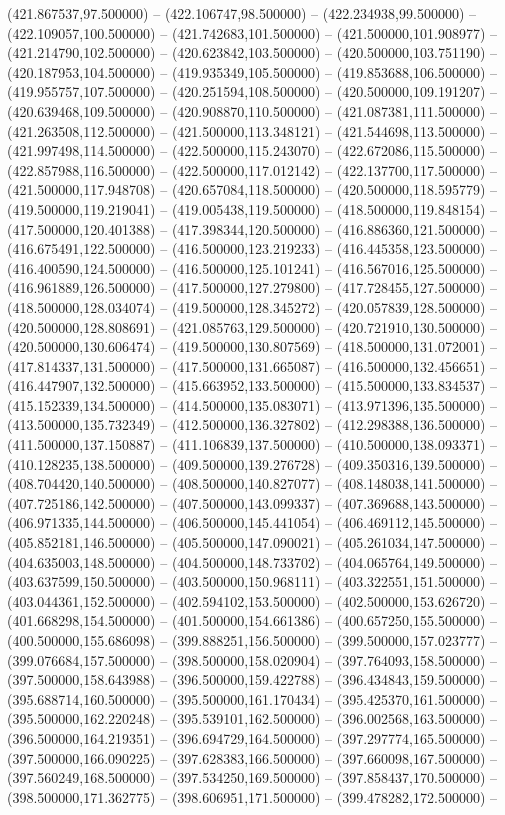 (421.867537,97.500000) -- (422.106747,98.500000) -- (422.234938,99.500000) -- (422.109057,100.500000) -- (421.742683,101.500000) -- (421.500000,101.908977) -- (421.214790,102.500000) -- (420.623842,103.500000) -- (420.500000,103.751190) -- (420.187953,104.500000) -- (419.935349,105.500000) -- (419.853688,106.500000) -- (419.955757,107.500000) -- (420.251594,108.500000) -- (420.500000,109.191207) -- (420.639468,109.500000) -- (420.908870,110.500000) -- (421.087381,111.500000) -- (421.263508,112.500000) -- (421.500000,113.348121) -- (421.544698,113.500000) -- (421.997498,114.500000) -- (422.500000,115.243070) -- (422.672086,115.500000) -- (422.857988,116.500000) -- (422.500000,117.012142) -- (422.137700,117.500000) -- (421.500000,117.948708) -- (420.657084,118.500000) -- (420.500000,118.595779) -- (419.500000,119.219041) -- (419.005438,119.500000) -- (418.500000,119.848154) -- (417.500000,120.401388) -- (417.398344,120.500000) -- (416.886360,121.500000) -- (416.675491,122.500000) -- (416.500000,123.219233) -- (416.445358,123.500000) -- (416.400590,124.500000) -- (416.500000,125.101241) -- (416.567016,125.500000) -- (416.961889,126.500000) -- (417.500000,127.279800) -- (417.728455,127.500000) -- (418.500000,128.034074) -- (419.500000,128.345272) -- (420.057839,128.500000) -- (420.500000,128.808691) -- (421.085763,129.500000) -- (420.721910,130.500000) -- (420.500000,130.606474) -- (419.500000,130.807569) -- (418.500000,131.072001) -- (417.814337,131.500000) -- (417.500000,131.665087) -- (416.500000,132.456651) -- (416.447907,132.500000) -- (415.663952,133.500000) -- (415.500000,133.834537) -- (415.152339,134.500000) -- (414.500000,135.083071) -- (413.971396,135.500000) -- (413.500000,135.732349) -- (412.500000,136.327802) -- (412.298388,136.500000) -- (411.500000,137.150887) -- (411.106839,137.500000) -- (410.500000,138.093371) -- (410.128235,138.500000) -- (409.500000,139.276728) -- (409.350316,139.500000) -- (408.704420,140.500000) -- (408.500000,140.827077) -- (408.148038,141.500000) -- (407.725186,142.500000) -- (407.500000,143.099337) -- (407.369688,143.500000) -- (406.971335,144.500000) -- (406.500000,145.441054) -- (406.469112,145.500000) -- (405.852181,146.500000) -- (405.500000,147.090021) -- (405.261034,147.500000) -- (404.635003,148.500000) -- (404.500000,148.733702) -- (404.065764,149.500000) -- (403.637599,150.500000) -- (403.500000,150.968111) -- (403.322551,151.500000) -- (403.044361,152.500000) -- (402.594102,153.500000) -- (402.500000,153.626720) -- (401.668298,154.500000) -- (401.500000,154.661386) -- (400.657250,155.500000) -- (400.500000,155.686098) -- (399.888251,156.500000) -- (399.500000,157.023777) -- (399.076684,157.500000) -- (398.500000,158.020904) -- (397.764093,158.500000) -- (397.500000,158.643988) -- (396.500000,159.422788) -- (396.434843,159.500000) -- (395.688714,160.500000) -- (395.500000,161.170434) -- (395.425370,161.500000) -- (395.500000,162.220248) -- (395.539101,162.500000) -- (396.002568,163.500000) -- (396.500000,164.219351) -- (396.694729,164.500000) -- (397.297774,165.500000) -- (397.500000,166.090225) -- (397.628383,166.500000) -- (397.660098,167.500000) -- (397.560249,168.500000) -- (397.534250,169.500000) -- (397.858437,170.500000) -- (398.500000,171.362775) -- (398.606951,171.500000) -- (399.478282,172.500000) -- 